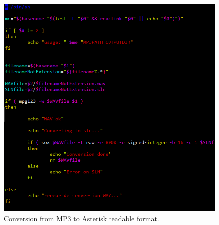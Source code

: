 \begin{figure}[!ht]
  \caption{Conversion from MP3 to Asterisk readable format.}
  \centering
    \includegraphics[width=1\textwidth]{img/convertMP3.png}
\end{figure}